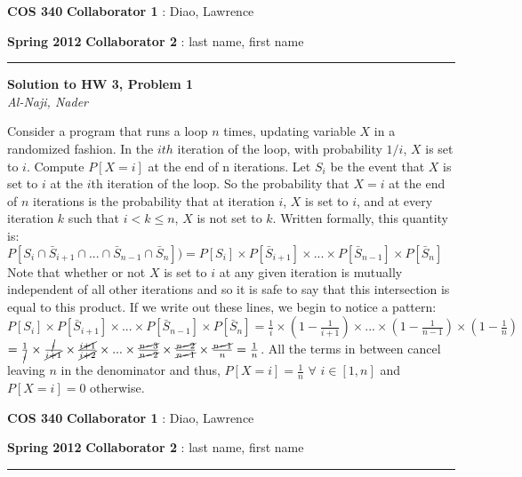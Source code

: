 \documentclass[12pt]{article}
\newcommand{\myheader}[4]
{\vspace*{-0.5in}
\noindent
{#1} \hfill {#3}

\noindent
{#2} \hfill {#4}

\noindent
\rule[8pt]{\textwidth}{1pt}

\vspace{1ex} 
}  %
\newcommand{\myalgsheader}[0]
{\myheader
{ {\bf{COS 340}} }
{ {\bf{Spring 2012}} }
{ {\bf{Collaborator 1}} : Diao, Lawrence }
{ {\bf{Collaborator 2}} : last name, first name}
}
\newcommand{\myhwtitle}[3]
{\begin{center}
{\large {\bf Solution to HW {#1}, Problem {#2}}}\\
\medskip 
{\it {#3}} %
\end{center}}
\begin{document}
\myalgsheader

\pagestyle{plain}

\myhwtitle{3}{1}{Al-Naji, Nader}

\bigskip

Consider a program that runs a loop $n$ times, updating variable $X$ in a randomized fashion. In the 
$ith$ iteration of the loop, with probability $1/i$, $X$ is set to $i$. Compute
$P[X = i]$ at the end of n iterations.
\newline
\newline
Let $S_i$ be the event that $X$ is set to $i$ at the $i$th iteration of the loop. So the probability that $X = i$ 
at the end of $n$ iterations is the probability that at iteration $i$, $X$ is set to $i$, and at every iteration 
$k$ such that $i < k \leq n$, $X$ is not set to $k$. Written formally, this quantity is:
\newline
\newline
$P[S_i \cap \bar{S}_{i+1} \cap ... \cap \bar{S}_{n-1} \cap \bar{S}_n]) = P[S_i] \times P[\bar{S}_{i+1}] \times ... \times P[\bar{S}_{n-1}] \times P[\bar{S}_n]$
\newline
Note that whether or not $X$ is set to $i$ at any given iteration is mutually independent of all other iterations and so it is
safe to say that this intersection is equal to this product.
\newline
\newline
If we write out these lines, we begin to notice a pattern:
\newline
\newline
$P[S_i] \times P[\bar{S}_{i+1}] \times ... \times P[\bar{S}_{n-1}] \times P[\bar{S}_n] = \frac{1}{i} \times (1 - \frac{1}{i+1}) 
\times ... \times (1 - \frac{1}{n-1}) \times (1 - \frac{1}{n})$
\newline
$= \frac{1}{\cancel{i}} \times \frac{\cancel{i}}{\cancel{i+1}} \times \frac{\cancel{i+1}}{\cancel{i+2}} \times ... \times \frac{\cancel{n-3}}{\cancel{n-2}} \times \frac{\cancel{n-2}}{\cancel{n-1}} \times \frac{\cancel{n-1}}{n} = \frac{1}{n}$.
\newline
\newline
All the terms in between cancel leaving $n$ in the denominator and thus, $P[X = i] = \frac{1}{n}$ $ \forall $ $ i \in [1, n]$ and $P[X=i] = 0$ otherwise.


\pagebreak

\myalgsheader
\end{document}
